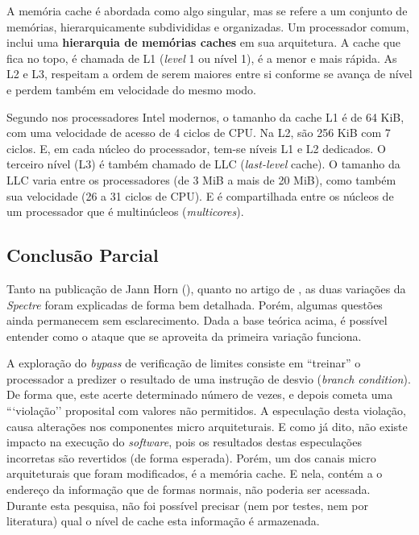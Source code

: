 \documentclass[
	article,			    %
	12pt,				    %
	oneside,			    %
	a4paper,			    %
	chapter=TITLE,		    %
	section=TITLE,		    %
	subsection=TITLE,	    %
	english,			    %
	brazil,				    %
	sumario=tradicional
]{abntex2}
\begin{document}
A memória cache é abordada como algo singular, mas se refere a um conjunto de memórias, hierarquicamente subdivididas e organizadas. Um processador comum, inclui uma \textbf{hierarquia de memórias caches} em sua arquitetura. A cache que fica no topo, é chamada de L1 (\emph{level} 1 ou nível 1), é a menor e mais rápida. As L2 e L3, respeitam a ordem de serem maiores entre si conforme se avança de nível e perdem também em velocidade do mesmo modo.

Segundo  nos processadores Intel modernos, o tamanho da cache L1 é de 64 KiB, com uma velocidade de acesso de 4 ciclos de CPU. Na L2, são 256 KiB com 7 ciclos. E, em cada núcleo do processador, tem-se níveis L1 e L2 dedicados. O terceiro nível (L3) é também chamado de LLC (\emph{last-level} cache). O tamanho da LLC varia entre os processadores (de 3 MiB a mais de 20 MiB), como também sua velocidade (26 a 31 ciclos de CPU). E é compartilhada entre os núcleos de um processador que é multinúcleos (\emph{multicores}).

\subsection{Conclusão Parcial}
Tanto na publicação de Jann Horn (\citeyear{Jann2018Reading}), quanto no artigo de , as duas variações da \emph{Spectre} foram explicadas de forma bem detalhada. Porém, algumas questões ainda permanecem sem esclarecimento. Dada a base teórica acima, é possível entender como o ataque que se aproveita da primeira variação funciona.

A exploração do \emph{bypass} de verificação de limites consiste em “treinar” o processador a predizer o resultado de uma instrução de desvio (\emph{branch condition}). De forma que, este acerte determinado número de vezes, e depois cometa uma ```violação'' proposital com valores não permitidos. A especulação desta violação, causa alterações nos componentes micro arquiteturais. E como já dito, não existe impacto na execução do \emph{software}, pois os resultados destas especulações incorretas são revertidos (de forma esperada). Porém, um dos canais micro arquiteturais que foram modificados, é a memória cache. E nela, contém a o endereço da informação que de formas normais, não poderia ser acessada. Durante esta pesquisa, não foi possível precisar (nem por testes, nem por literatura) qual o nível de cache esta informação é armazenada.
\end{document}
